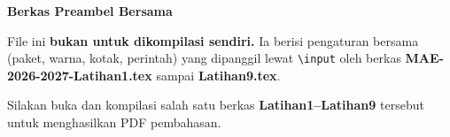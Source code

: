 \documentclass[11pt,a4paper]{report}
\theoremstyle{gaya}
\begin{document}
  \thispagestyle{empty}
  \begin{center}
  \vspace*{3cm}
  {\Huge\bfseries\color{ungu} Berkas Preambel Bersama}\\[1cm]
  \begin{tcolorbox}[enhanced,width=0.85\textwidth,colback=ungumuda,
    colframe=ungu,arc=4pt,boxrule=1pt]
  \centering
  File ini \textbf{bukan untuk dikompilasi sendiri.} Ia berisi pengaturan
  bersama (paket, warna, kotak, perintah) yang dipanggil lewat
  \texttt{\textbackslash input} oleh berkas \textbf{MAE-2026-2027-Latihan1.tex}
  sampai \textbf{Latihan9.tex}.

  \medskip
  Silakan buka dan kompilasi salah satu berkas \textbf{Latihan1--Latihan9}
  tersebut untuk menghasilkan PDF pembahasan.
  \end{tcolorbox}
  \end{center}
  
\end{document}
